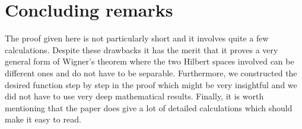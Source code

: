 \section{Concluding remarks}
The proof given here is not particularly short and it involves quite a few calculations. Despite these drawbacks it has the merit that it proves a very general form of Wigner's theorem where the two Hilbert spaces involved can be different ones and do not have to be separable. Furthermore, we constructed the desired function step by step in the proof which might be very insightful and we did not have to use very deep mathematical results. Finally, it is worth mentioning that the paper does give a lot of detailed calculations which should make it easy to read.